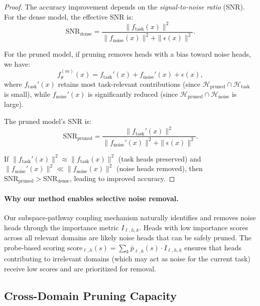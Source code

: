 \begin{proof}
The accuracy improvement depends on the \emph{signal-to-noise ratio} (SNR).
For the dense model, the effective SNR is:
\begin{equation}
\mathrm{SNR}_{\mathrm{dense}} = \frac{\|f_{\mathrm{task}}(x)\|^2}{\|f_{\mathrm{noise}}(x)\|^2 + \|\epsilon(x)\|^2}.
\end{equation}

For the pruned model, if pruning removes heads with a bias toward noise heads, we have:
\begin{equation}
f_{\theta}^{(m)}(x) = f_{\mathrm{task}}'(x) + f_{\mathrm{noise}}'(x) + \epsilon(x),
\end{equation}
where $f_{\mathrm{task}}'(x)$ retains most task-relevant contributions (since $\mathcal{H}_{\mathrm{pruned}} \cap \mathcal{H}_{\mathrm{task}}$ is small), while $f_{\mathrm{noise}}'(x)$ is significantly reduced (since $\mathcal{H}_{\mathrm{pruned}} \cap \mathcal{H}_{\mathrm{noise}}$ is large).

The pruned model's SNR is:
\begin{equation}
\mathrm{SNR}_{\mathrm{pruned}} = \frac{\|f_{\mathrm{task}}'(x)\|^2}{\|f_{\mathrm{noise}}'(x)\|^2 + \|\epsilon(x)\|^2}.
\end{equation}

If $\|f_{\mathrm{task}}'(x)\|^2 \approx \|f_{\mathrm{task}}(x)\|^2$ (task heads preserved) and $\|f_{\mathrm{noise}}'(x)\|^2 \ll \|f_{\mathrm{noise}}(x)\|^2$ (noise heads removed), then $\mathrm{SNR}_{\mathrm{pruned}} > \mathrm{SNR}_{\mathrm{dense}}$, leading to improved accuracy.
\end{proof}

\paragraph{Why our method enables selective noise removal.}
Our subspace-pathway coupling mechanism naturally identifies and removes noise heads through the importance metric $I_{\ell,h,k}$.
Heads with low importance scores across all relevant domains are likely noise heads that can be safely pruned.
The probe-based scoring $\mathrm{score}_{\ell,h}(s) = \sum_{k} \bar{p}_{\ell,k}(s) \cdot I_{\ell,h,k}$ ensures that heads contributing to irrelevant domains (which may act as noise for the current task) receive low scores and are prioritized for removal.

\subsection{Cross-Domain Pruning Capacity}
\label{app:math_cross_domain_capacity}

